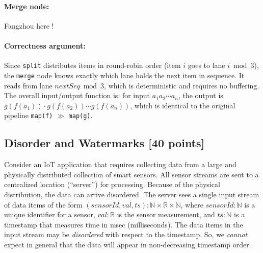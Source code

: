 \documentclass[11pt]{article}
\newcommand{\mnt}[1]{{\small\texttt{#1}}}
\theoremstyle{definition}
\newcommand{\N}{\mathbb{N}}
\newcommand{\R}{\mathbb{R}}
\newcommand{\serial}{\gg}
\newcommand{\sensorId}{\mathit{sensorId}}
\newcommand{\val}{\mathit{val}}
\newcommand{\ts}{\mathit{ts}}
\begin{document}

\paragraph{Merge node:}
Fangzhou here !

\paragraph{Correctness argument:} Since \mnt{split} distributes items in round-robin order (item $i$ goes to lane $i \bmod 3$), the \mnt{merge} node knows exactly which lane holds the next item in sequence. It reads from lane $\mathit{nextSeq} \bmod 3$, which is deterministic and requires no buffering. The overall input/output function is: for input $a_1 a_2 \cdots a_n$, the output is $g(f(a_1)) \cdot g(f(a_2)) \cdots g(f(a_n))$, which is identical to the original pipeline \mnt{map(f)} $\serial$ \mnt{map(g)}.

\clearpage %
\subsection{Disorder and Watermarks [40 points]}

Consider an IoT application that requires collecting data from a large and physically distributed collection of smart sensors. All sensor streams are sent to a centralized location (``server'') for processing. Because of the physical distribution, the data can arrive disordered. The server sees a single input stream of data items of the form $(\sensorId, \val, \ts): \N \times \R \times \N$, where $\sensorId: \N$ is a unique identifier for a sensor, $\val: \R$ is the sensor measurement, and $\ts: \N$ is a timestamp that measures time in msec (milliseconds). The data items in the input stream may be \emph{disordered} with respect to the timestamp. So, we \emph{cannot} expect in general that the data will appear in non-decreasing timestamp order.
\end{document}
